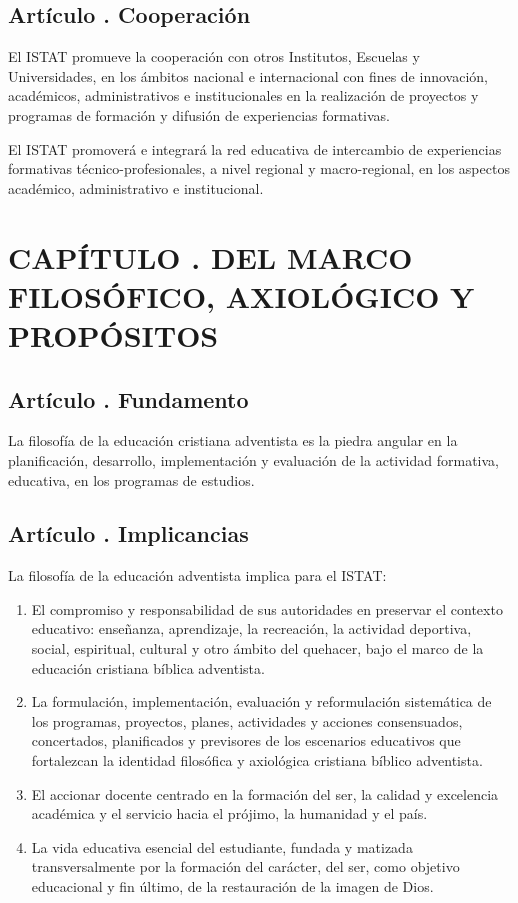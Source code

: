 \subsection{Artículo . Cooperación}
\addtocounter{ns}{1}
El ISTAT promueve la cooperación con otros Institutos, Escuelas y Universidades, en los ámbitos nacional e internacional con fines de innovación, académicos, administrativos e institucionales en la realización de proyectos y programas de formación y difusión de experiencias formativas. 
 
El ISTAT promoverá e integrará la red educativa de intercambio de experiencias formativas técnico-profesionales, a nivel regional y macro-regional, en los aspectos académico, administrativo e institucional.
\section{CAPÍTULO . DEL MARCO FILOSÓFICO, AXIOLÓGICO Y PROPÓSITOS }
\setcounter{re}{1}
\subsection{Artículo . Fundamento}
\addtocounter{ns}{1}
La filosofía de la educación cristiana adventista es la piedra angular en la planificación, desarrollo, implementación y evaluación de la actividad formativa, educativa, en los programas de estudios. 
\subsection{Artículo . Implicancias}
\addtocounter{ns}{1}
La filosofía de la educación adventista implica para el ISTAT: 
\begin{enumerate}
\item El compromiso y responsabilidad de sus autoridades en preservar el contexto educativo: enseñanza, aprendizaje, la recreación, la actividad deportiva, social, espiritual, cultural y otro ámbito del quehacer, bajo el marco de la educación cristiana bíblica adventista. 
\item La formulación, implementación, evaluación y reformulación sistemática de los programas, proyectos, planes, actividades y acciones consensuados, concertados, planificados y previsores de los escenarios educativos que fortalezcan la identidad filosófica y axiológica cristiana bíblico adventista. 
\item El accionar docente centrado en la formación del ser, la calidad y excelencia académica y el servicio hacia el prójimo, la humanidad y el país. 
\item La vida educativa esencial del estudiante, fundada y matizada transversalmente por la formación del carácter, del ser, como objetivo educacional y fin último, de la restauración de la imagen de Dios. 

\end{enumerate}
